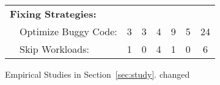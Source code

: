 \begin{table}[tb!]
\begin{adjustwidth}{-.5in}{-.5in}
{{\begin{tabular}{|lcccccc|}
\multicolumn{7}{|l|}{\bf Fixing Strategies:}\\
\ \ {{Optimize Buggy Code:}}              								&  3        &    3       &   4    &    9         &   5      &  24 \\
\ \ {Skip Workloads:}              									&  1        &    0       &   4    &    1         &   0      &   6\\
\hline
\end{tabular}
}
}
\end{adjustwidth}
\vspace{0.1in}
{Empirical Studies in Section~\ref{sec:study}.}
{\color{red} changed}
\end{table}

